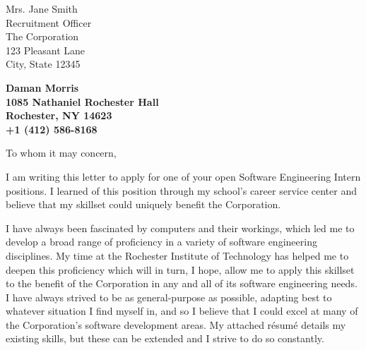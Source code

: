 \documentclass[11pt]{letter} %
\begin{document}

\begin{letter}{Mrs. Jane Smith \\
Recruitment Officer \\
The Corporation \\
123 Pleasant Lane \\
City, State 12345} 


\begin{center}
\large\bf Daman Morris \\ %
1085 Nathaniel Rochester Hall \\ Rochester, NY 14623 \\ +1 (412) 586-8168 %
\end{center}
\vfill

\signature{Daman Morris} %


\opening{To whom it may concern,}

I am writing this letter to apply for one of your open Software Engineering
Intern positions. I learned of this position through my school's career service
center and believe that my skillset could uniquely benefit the Corporation.

I have always been fascinated by computers and their workings, which led me to
develop a broad range of proficiency in a variety of software engineering
disciplines. My time at the Rochester Institute of Technology has helped me to
deepen this proficiency which will in turn, I hope, allow me to apply this
skillset to the benefit of the Corporation in any and all of its software
engineering needs. I have always strived to be as general-purpose as possible,
adapting best to whatever situation I find myself in, and so I believe that I
could excel at many of the Corporation's software development areas. My
attached résumé details my existing skills, but these can be extended and I
strive to do so constantly.


\end{letter}
\end{document}
